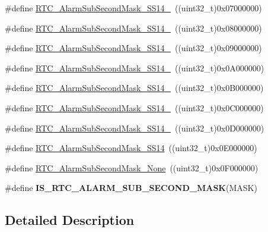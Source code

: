 \begin{DoxyCompactItemize}
\#define \hyperlink{group___r_t_c___alarm___sub___seconds___masks___definitions_ga65c2ed26d90ef3fe08cd938a5e7cec90}{R\-T\-C\-\_\-\-Alarm\-Sub\-Second\-Mask\-\_\-\-S\-S14\-\_}~((uint32\-\_\-t)0x07000000)
\item 
\#define \hyperlink{group___r_t_c___alarm___sub___seconds___masks___definitions_ga9a6d13dc2baaf30007f43d4086b6ccad}{R\-T\-C\-\_\-\-Alarm\-Sub\-Second\-Mask\-\_\-\-S\-S14\-\_}~((uint32\-\_\-t)0x08000000)
\item 
\#define \hyperlink{group___r_t_c___alarm___sub___seconds___masks___definitions_ga4a8e2fd87578d1357ec8f169766119ec}{R\-T\-C\-\_\-\-Alarm\-Sub\-Second\-Mask\-\_\-\-S\-S14\-\_}~((uint32\-\_\-t)0x09000000)
\item 
\#define \hyperlink{group___r_t_c___alarm___sub___seconds___masks___definitions_ga5eecab4e9eed9231aed9bf66b0b6efe8}{R\-T\-C\-\_\-\-Alarm\-Sub\-Second\-Mask\-\_\-\-S\-S14\-\_}~((uint32\-\_\-t)0x0\-A000000)
\item 
\#define \hyperlink{group___r_t_c___alarm___sub___seconds___masks___definitions_gae8a49e83d96a1651c202ccdf30d68f0d}{R\-T\-C\-\_\-\-Alarm\-Sub\-Second\-Mask\-\_\-\-S\-S14\-\_}~((uint32\-\_\-t)0x0\-B000000)
\item 
\#define \hyperlink{group___r_t_c___alarm___sub___seconds___masks___definitions_ga21da05a4b786c38755ff01564a4de83b}{R\-T\-C\-\_\-\-Alarm\-Sub\-Second\-Mask\-\_\-\-S\-S14\-\_}~((uint32\-\_\-t)0x0\-C000000)
\item 
\#define \hyperlink{group___r_t_c___alarm___sub___seconds___masks___definitions_ga00430f0eae750c0d41339d0dca26a8e5}{R\-T\-C\-\_\-\-Alarm\-Sub\-Second\-Mask\-\_\-\-S\-S14\-\_}~((uint32\-\_\-t)0x0\-D000000)
\item 
\#define \hyperlink{group___r_t_c___alarm___sub___seconds___masks___definitions_ga8d5f1d8afee279f519dccca14522fe27}{R\-T\-C\-\_\-\-Alarm\-Sub\-Second\-Mask\-\_\-\-S\-S14}~((uint32\-\_\-t)0x0\-E000000)
\item 
\#define \hyperlink{group___r_t_c___alarm___sub___seconds___masks___definitions_ga201f3ce456e20ffbc3f9af83c972aaa7}{R\-T\-C\-\_\-\-Alarm\-Sub\-Second\-Mask\-\_\-\-None}~((uint32\-\_\-t)0x0\-F000000)
\item 
\#define {\bfseries I\-S\-\_\-\-R\-T\-C\-\_\-\-A\-L\-A\-R\-M\-\_\-\-S\-U\-B\-\_\-\-S\-E\-C\-O\-N\-D\-\_\-\-M\-A\-S\-K}(M\-A\-S\-K)
\end{DoxyCompactItemize}


\subsection{Detailed Description}


